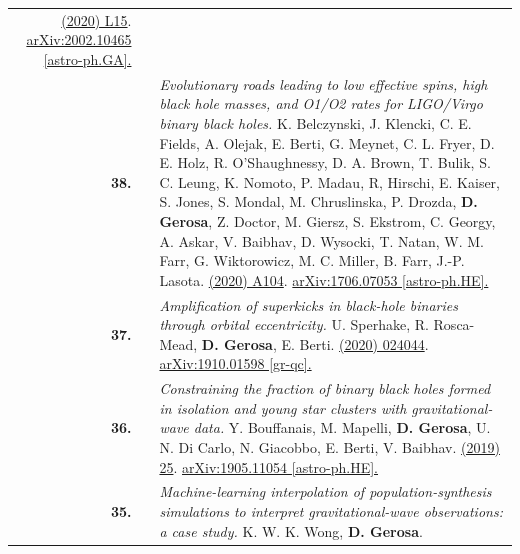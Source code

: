 {\begin{longtable}{rp{0.3cm}p{15.8cm}}
\href{https://iopscience.iop.org/article/10.3847/2041-8213/ab8ac9}{\apjl 894 (2020) L15}. \href{https://arxiv.org/abs/2002.10465}{arXiv:2002.10465 [astro-ph.GA].}
\vspace{0.09cm}\\
%
\textbf{38.} & & \textit{Evolutionary roads leading to low effective spins, high black hole masses, and O1/O2 rates for LIGO/Virgo binary black holes.}
\newline{}
K. Belczynski, J. Klencki, C. E. Fields, A. Olejak, E. Berti, G. Meynet, C. L. Fryer, D. E. Holz, R. O'Shaughnessy, D. A. Brown, T. Bulik, S. C. Leung,  K. Nomoto, P. Madau, R, Hirschi, E. Kaiser, S. Jones, S. Mondal, M. Chruslinska, P. Drozda, \textbf{D. Gerosa}, Z. Doctor, M. Giersz, S. Ekstr\:om, C. Georgy, A. Askar, V. Baibhav, D. Wysocki, T. Natan, W. M. Farr, G. Wiktorowicz, M. C. Miller, B. Farr, J.-P. Lasota.
\newline{}
\href{https://www.aanda.org/articles/aa/full_html/2020/04/aa36528-19/aa36528-19.html}{\aap 636 (2020) A104}. \href{https://arxiv.org/abs/1706.07053}{arXiv:1706.07053 [astro-ph.HE].}
\vspace{0.09cm}\\
%
\textbf{37.} & & \textit{Amplification of superkicks in black-hole binaries through orbital eccentricity.}
\newline{}
U. Sperhake, R. Rosca-Mead, \textbf{D. Gerosa}, E. Berti.
\newline{}
\href{https://journals.aps.org/prd/abstract/10.1103/PhysRevD.101.024044}{\prd 101 (2020) 024044}. \href{https://arxiv.org/abs/1910.01598}{arXiv:1910.01598 [gr-qc].}
\vspace{0.09cm}\\
%
\textbf{36.} & & \textit{Constraining the fraction of binary black holes formed in isolation and young star clusters with gravitational-wave data.}
\newline{}
Y. Bouffanais, M. Mapelli, \textbf{D. Gerosa}, U. N. Di Carlo, N. Giacobbo, E. Berti, V. Baibhav.
\newline{}
\href{https://iopscience.iop.org/article/10.3847/1538-4357/ab4a79}{\apj 886 (2019) 25}. \href{https://arxiv.org/abs/1905.11054}{arXiv:1905.11054 [astro-ph.HE].}
\vspace{0.09cm}\\
%
\textbf{35.} & & \textit{Machine-learning interpolation of population-synthesis simulations to interpret gravitational-wave observations: a case study.}
\newline{}
K. W. K. Wong, \textbf{D. Gerosa}.

\end{longtable}}
